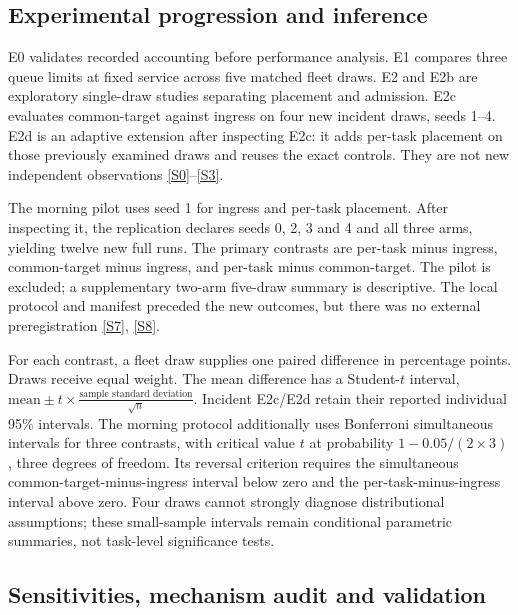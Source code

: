 \documentclass[11pt,a4paper]{article}
\begin{document}
\subsection{Experimental progression and inference}\label{sec:2.6}

E0 validates recorded accounting before performance analysis. E1 compares three queue limits at fixed service across five matched fleet draws. E2 and E2b are exploratory single-draw studies separating placement and admission. E2c evaluates common-target against ingress on four new incident draws, seeds 1--4. E2d is an adaptive extension after inspecting E2c: it adds per-task placement on those previously examined draws and reuses the exact controls. They are not new independent observations \hyperref[source-s0]{[S0]}--\hyperref[source-s3]{[S3]}.

The morning pilot uses seed 1 for ingress and per-task placement. After inspecting it, the replication declares seeds 0, 2, 3 and 4 and all three arms, yielding twelve new full runs. The primary contrasts are per-task minus ingress, common-target minus ingress, and per-task minus common-target. The pilot is excluded; a supplementary two-arm five-draw summary is descriptive. The local protocol and manifest preceded the new outcomes, but there was no external preregistration \hyperref[source-s7]{[S7]}, \hyperref[source-s8]{[S8]}.

For each contrast, a fleet draw supplies one paired difference in percentage points. Draws receive equal weight. The mean difference has a Student-$t$ interval, $\text{mean}\pm t\times\frac{\text{sample standard deviation}}{\sqrt{n}}$. Incident E2c/E2d retain their reported individual 95\% intervals. The morning protocol additionally uses Bonferroni simultaneous intervals for three contrasts, with critical value $t$ at probability $1-0.05/(2\times 3)$, three degrees of freedom. Its reversal criterion requires the simultaneous common-target-minus-ingress interval below zero and the per-task-minus-ingress interval above zero. Four draws cannot strongly diagnose distributional assumptions; these small-sample intervals remain conditional parametric summaries, not task-level significance tests.

\subsection{Sensitivities, mechanism audit and validation}\label{sec:2.7}
\end{document}
